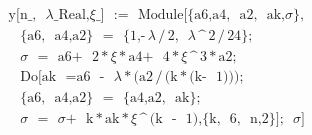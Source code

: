 \documentclass{article}
\begin{document}
{\ttfamily
$\begin{array}{l}
\text{y}\text{[}\text{n\_}\text{,}\text{ }\text{$\lambda$\_Real}\text{,}\text{
}\text{$\xi$\_}\text{]}\text{ }\text{:=}\text{ }\text{Module}\text{[}\text{\{}\text{a6}\text{,}\text{
}\text{a4}\text{,}\text{ }\text{a2}\text{,}\text{ }\text{ak}\text{,}\text{
}\text{$\sigma$}\text{\}}\text{,}\text{ }\\
\text{\ \ \ }\,\text{\{}\text{a6}\text{,}\text{ }\text{a4}\text{,}\text{
}\text{a2}\text{\}}\text{ }\text{=}\text{ }\text{\{}\text{1}\text{,}\text{
}\text{-}\,\text{$\lambda$}\,\text{/}\,\text{2}\text{,}\text{ }\text{$\lambda$}\,\text{\textasciicircum
}\,\text{2}\,\text{/}\,\text{24}\text{\}}\text{;}\text{ }\\
\text{\ \ \ \ }\,\text{$\sigma$}\text{ }\text{=}\text{ }\text{a6}\text{
}\text{+}\text{ }\text{2}\,\text{*}\,\text{$\xi$}\,\text{*}\,\text{a4}\text{
}\text{+}\text{ }\text{4}\,\text{*}\,\text{$\xi$}\,\text{\textasciicircum
}\,\text{3}\,\text{*}\,\text{a2}\text{;}\text{ }\\
\text{\ \ \ \ }\,\text{Do}\text{[}\text{ak}\text{ }\text{=}\text{
}\text{a6}\text{ }\text{-}\text{ }\text{$\lambda$}\,\text{*}\,\text{(}\text{a2}\,\text{/}\,\text{(}\text{k}\,\text{*}\,\text{(}\text{k}\text{
}\text{-}\text{ }\text{1}\text{)}\text{)}\text{)}\text{;}\text{
}\\
\text{\ \ \ \ \ \ }\,\text{\{}\text{a6}\text{,}\text{ }\text{a4}\text{,}\text{
}\text{a2}\text{\}}\text{ }\text{=}\text{ }\text{\{}\text{a4}\text{,}\text{
}\text{a2}\text{,}\text{ }\text{ak}\text{\}}\text{;}\text{ }\\
\text{\ \ \ \ \ \ }\,\text{$\sigma$}\text{ }\text{=}\text{ }\text{$\sigma$}\text{
}\text{+}\text{ }\text{k}\,\text{*}\,\text{ak}\,\text{*}\,\text{$\xi$}\,\text{\textasciicircum
}\,\text{(}\text{k}\text{ }\text{-}\text{ }\text{1}\text{)}\text{,}\text{
}\text{\{}\text{k}\text{,}\text{ }\text{6}\text{,}\text{ }\text{n}\text{,}\text{
}\text{2}\text{\}}\text{]}\text{;}\text{ }\text{$\sigma$}\text{]}\end{array}$}
\end{document}
